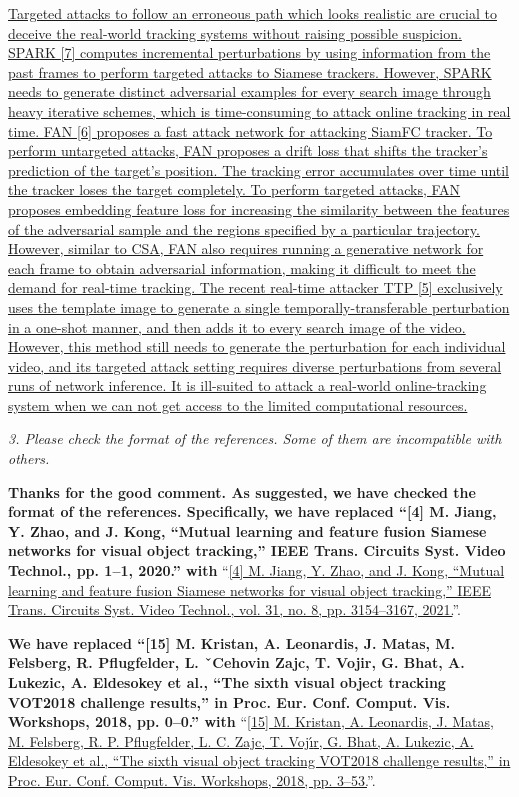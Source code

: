 \documentclass[12pt]{article}
\begin{document}
\uline{Targeted attacks to follow an erroneous path which looks realistic are crucial to deceive the real-world tracking systems without raising possible suspicion. SPARK [7] computes incremental perturbations by using information from the past frames to perform targeted attacks to Siamese trackers. However, SPARK needs to generate distinct adversarial examples for every search image through heavy iterative schemes, which is time-consuming to attack online tracking in real time. FAN [6] proposes a fast attack network for attacking SiamFC tracker. To perform untargeted attacks, FAN proposes a drift loss that shifts the tracker’s prediction of the target’s position. The tracking error accumulates over time until the tracker loses the target completely. To perform targeted attacks, FAN proposes embedding feature loss for increasing the similarity between the features of the adversarial sample and the regions specified by a particular trajectory. However, similar to CSA, FAN also requires running a generative network for each frame to obtain adversarial information, making it difficult to meet the demand for real-time tracking. The recent real-time attacker TTP [5] exclusively uses the template image to generate a single temporally-transferable perturbation in a one-shot manner, and then adds it to every search image of the video. However, this method still needs to generate the perturbation for each individual video, and its targeted attack setting requires diverse perturbations from several runs of network inference. It is ill-suited to attack a real-world online-tracking system when we can not get access to the limited computational resources.}

\textit{3. Please check the format of the references. Some of them are incompatible with others.}

\textbf{Thanks for the good comment. As suggested, we have checked the format of the references. Specifically, we have replaced ``[4] M. Jiang, Y. Zhao, and J. Kong, “Mutual learning and feature fusion
Siamese networks for visual object tracking,” IEEE Trans. Circuits Syst. Video Technol., pp. 1–1, 2020.'' with} ``\uline{[4] M. Jiang, Y. Zhao, and J. Kong, “Mutual learning and feature fusion
Siamese networks for visual object tracking,” IEEE Trans. Circuits Syst. Video Technol., vol. 31, no. 8, pp. 3154–3167, 2021.}''.

\textbf{We have replaced ``[15] M. Kristan, A. Leonardis, J. Matas, M. Felsberg, R. Pflugfelder, L. ˇCehovin Zajc, T. Vojir, G. Bhat, A. Lukezic, A. Eldesokey et al., “The sixth visual object tracking VOT2018 challenge results,” in Proc. Eur. Conf. Comput. Vis. Workshops, 2018, pp. 0–0.'' with} ``\uline{[15] M. Kristan, A. Leonardis, J. Matas, M. Felsberg, R. P. Pflugfelder, L. C. Zajc, T. Voj{\'{\i}}r, G. Bhat, A. Lukezic, A. Eldesokey et al., “The sixth visual object tracking VOT2018 challenge results,” in Proc. Eur. Conf. Comput. Vis. Workshops, 2018, pp. 3–53.}''.
\end{document}
